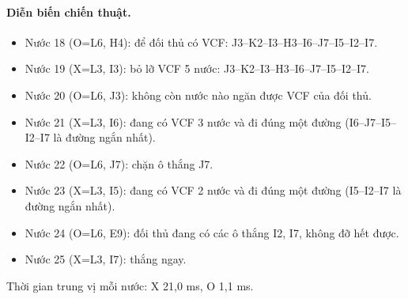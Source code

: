 \paragraph{Diễn biến chiến thuật.}
\begin{itemize}\small
\setlength{\itemsep}{0pt}
  \item Nước 18 (O=L6, H4): để đối thủ có VCF: J3--K2--I3--H3--I6--J7--I5--I2--I7.
  \item Nước 19 (X=L3, I3): bỏ lỡ VCF 5 nước: J3--K2--I3--H3--I6--J7--I5--I2--I7.
  \item Nước 20 (O=L6, J3): không còn nước nào ngăn được VCF của đối thủ.
  \item Nước 21 (X=L3, I6): đang có VCF 3 nước và đi đúng một đường (I6--J7--I5--I2--I7 là đường ngắn nhất).
  \item Nước 22 (O=L6, J7): chặn ô thắng J7.
  \item Nước 23 (X=L3, I5): đang có VCF 2 nước và đi đúng một đường (I5--I2--I7 là đường ngắn nhất).
  \item Nước 24 (O=L6, E9): đối thủ đang có các ô thắng I2, I7, không đỡ hết được.
  \item Nước 25 (X=L3, I7): thắng ngay.
\end{itemize}
Thời gian trung vị mỗi nước: X 21,0 ms, O 1,1 ms.
\clearpage

